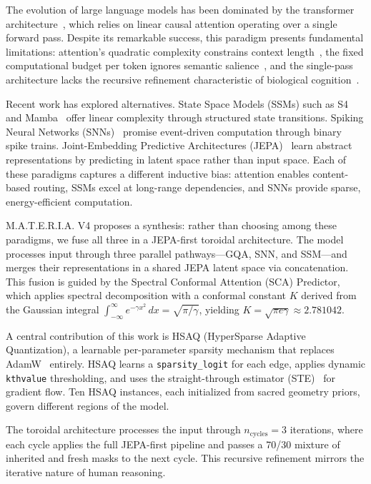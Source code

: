 \documentclass[conference]{IEEEtran}
\newcommand{\materia}{\textsc{M.A.T.E.R.I.A.}}
\newcommand{\hsaq}{\textsc{HSAQ}}
\begin{document}
The evolution of large language models has been dominated by the transformer architecture~\cite{vaswani2017attention}, which relies on linear causal attention operating over a single forward pass. Despite its remarkable success, this paradigm presents fundamental limitations: attention's quadratic complexity constrains context length~\cite{child2019generating}, the fixed computational budget per token ignores semantic salience~\cite{zhu2023spikegpt}, and the single-pass architecture lacks the recursive refinement characteristic of biological cognition~\cite{lecun2022path}.

Recent work has explored alternatives. State Space Models (SSMs) such as S4~\cite{gu2021efficiently} and Mamba~\cite{gu2023mamba} offer linear complexity through structured state transitions. Spiking Neural Networks (SNNs)~\cite{maass1997networks, neftci2019surrogate} promise event-driven computation through binary spike trains. Joint-Embedding Predictive Architectures (JEPA)~\cite{lecun2022path, assran2023self} learn abstract representations by predicting in latent space rather than input space. Each of these paradigms captures a different inductive bias: attention enables content-based routing, SSMs excel at long-range dependencies, and SNNs provide sparse, energy-efficient computation.

\materia{} V4 proposes a synthesis: rather than choosing among these paradigms, we fuse all three in a JEPA-first toroidal architecture. The model processes input through three parallel pathways---GQA, SNN, and SSM---and merges their representations in a shared JEPA latent space via concatenation. This fusion is guided by the Spectral Conformal Attention (SCA) Predictor, which applies spectral decomposition with a conformal constant $K$ derived from the Gaussian integral $\int_{-\infty}^{\infty} e^{-\gamma x^2}\,dx = \sqrt{\pi/\gamma}$, yielding $K = \sqrt{\pi e \gamma} \approx 2.781042$.

A central contribution of this work is \hsaq{} (HyperSparse Adaptive Quantization), a learnable per-parameter sparsity mechanism that replaces AdamW~\cite{loshchilov2017decoupled} entirely. HSAQ learns a \texttt{sparsity\_logit} for each edge, applies dynamic \texttt{kthvalue} thresholding, and uses the straight-through estimator (STE)~\cite{bengio2013estimating} for gradient flow. Ten HSAQ instances, each initialized from sacred geometry priors, govern different regions of the model.

The toroidal architecture processes the input through $n_{\text{cycles}}=3$ iterations, where each cycle applies the full JEPA-first pipeline and passes a 70/30 mixture of inherited and fresh masks to the next cycle. This recursive refinement mirrors the iterative nature of human reasoning.
\end{document}
